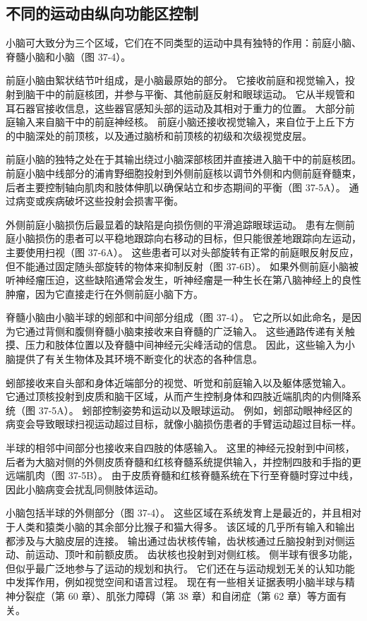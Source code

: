 \subsection{不同的运动由纵向功能区控制}

小脑可大致分为三个区域，它们在不同类型的运动中具有独特的作用：前庭小脑、脊髓小脑和小脑（图 37-4）。

前庭小脑由絮状结节叶组成，是小脑最原始的部分。 它接收前庭和视觉输入，投射到脑干中的前庭核团，并参与平衡、其他前庭反射和眼球运动。 它从半规管和耳石器官接收信息，这些器官感知头部的运动及其相对于重力的位置。 大部分前庭输入来自脑干中的前庭神经核。 前庭小脑还接收视觉输入，来自位于上丘下方的中脑深处的前顶核，以及通过脑桥和前顶核的初级和次级视觉皮层。

前庭小脑的独特之处在于其输出绕过小脑深部核团并直接进入脑干中的前庭核团。 前庭小脑中线部分的浦肯野细胞投射到外侧前庭核以调节外侧和内侧前庭脊髓束，后者主要控制轴向肌肉和肢体伸肌以确保站立和步态期间的平衡（图 37-5A）。 通过病变或疾病破坏这些投射会损害平衡。

外侧前庭小脑损伤后最显着的缺陷是向损伤侧的平滑追踪眼球运动。 患有左侧前庭小脑损伤的患者可以平稳地跟踪向右移动的目标，但只能很差地跟踪向左运动，主要使用扫视（图 37-6A）。 这些患者可以对头部旋转有正常的前庭眼反射反应，但不能通过固定随头部旋转的物体来抑制反射（图 37-6B）。 如果外侧前庭小脑被听神经瘤压迫，这些缺陷通常会发生，听神经瘤是一种生长在第八脑神经上的良性肿瘤，因为它直接走行在外侧前庭小脑下方。

脊髓小脑由小脑半球的蚓部和中间部分组成（图 37-4）。 它之所以如此命名，是因为它通过背侧和腹侧脊髓小脑束接收来自脊髓的广泛输入。 这些通路传递有关触摸、压力和肢体位置以及脊髓中间神经元尖峰活动的信息。 因此，这些输入为小脑提供了有关生物体及其环境不断变化的状态的各种信息。

蚓部接收来自头部和身体近端部分的视觉、听觉和前庭输入以及躯体感觉输入。 它通过顶核投射到皮质和脑干区域，从而产生控制身体和四肢近端肌肉的内侧降系统（图 37-5A）。 蚓部控制姿势和运动以及眼球运动。 例如，蚓部动眼神经区的病变会导致眼球扫视运动超过目标，就像小脑损伤患者的手臂运动超过目标一样。

半球的相邻中间部分也接收来自四肢的体感输入。 这里的神经元投射到中间核，后者为大脑对侧的外侧皮质脊髓和红核脊髓系统提供输入，并控制四肢和手指的更远端肌肉（图 37-5B）。 由于皮质脊髓和红核脊髓系统在下行至脊髓时穿过中线，因此小脑病变会扰乱同侧肢体运动。

小脑包括半球的外侧部分（图 37-4）。 这些区域在系统发育上是最近的，并且相对于人类和猿类小脑的其余部分比猴子和猫大得多。 该区域的几乎所有输入和输出都涉及与大脑皮层的连接。 输出通过齿状核传输，齿状核通过丘脑投射到对侧运动、前运动、顶叶和前额皮质。 齿状核也投射到对侧红核。 侧半球有很多功能，但似乎最广泛地参与了运动的规划和执行。 它们还在与运动规划无关的认知功能中发挥作用，例如视觉空间和语言过程。 现在有一些相关证据表明小脑半球与精神分裂症（第 60 章）、肌张力障碍（第 38 章）和自闭症（第 62 章）等方面有关。

